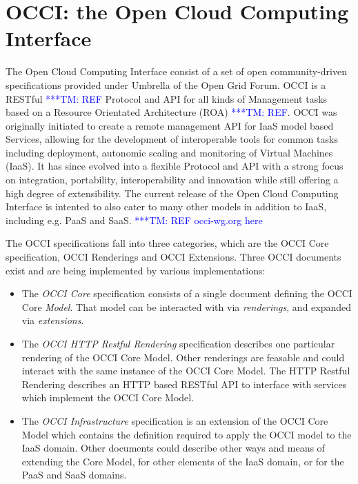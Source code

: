 \documentclass[10pt,conference,final,letterpaper,twoside,twocolumn,]{IEEEtran}
\newcommand{\tmnote}[1]{  {\textcolor{blue}    {***TM: #1}}}
\newcommand{\tmnote}[1]{}
\newcommand{\I}[1]{\textit{#1}}
\begin{document}
\section{OCCI: the Open Cloud Computing Interface}
\label{sec:occi}

 The Open Cloud Computing Interface consist of a set of open
 community-driven specifications provided under Umbrella of the Open
 Grid Forum. OCCI is a RESTful \tmnote{REF} Protocol and API for all
 kinds of Management tasks based on a Resource Orientated Architecture
 (ROA) \tmnote{REF}. OCCI was originally initiated to create a remote
 management API for IaaS model based Services, allowing for the
 development of interoperable tools for common tasks including
 deployment, autonomic scaling and monitoring of Virtual Machines
 (IaaS). It has since evolved into a flexible Protocol and API with a
 strong focus on integration, portability, interoperability and
 innovation while still offering a high degree of extensibility. The
 current release of the Open Cloud Computing Interface is intented to
 also cater to many other models in addition to IaaS, including e.g. 
 PaaS and SaaS. \tmnote{REF occi-wg.org here}

 The OCCI specifications fall into three categories, which are the
 OCCI Core specification, OCCI Renderings and OCCI Extensions.  Three
 OCCI documents exist and are being implemented by various
 implementations:
 
 \begin{itemize}

  \item The \I{OCCI Core} specification consists of a single document
  defining the OCCI Core \I{Model}. That model can be interacted with
  via \I{renderings}, and expanded via \I{extensions}.

  \item The \I{OCCI HTTP Restful Rendering} specification describes
  one particular rendering of the OCCI Core Model. Other renderings
  are feasable and could interact with the same instance of the OCCI
  Core Model.  The HTTP Restful Rendering describes an HTTP based
  RESTful API to interface with services which implement the OCCI Core
  Model.
 
  \item The \I{OCCI Infrastructure} specification is an extension of
  the OCCI Core Model which contains the definition required to apply
  the OCCI model to the IaaS domain. Other documents could describe
  other ways and means of extending the Core Model, for other elements
  of the IaaS domain, or for the PaaS and SaaS domains.

 \end{itemize}
\end{document}
